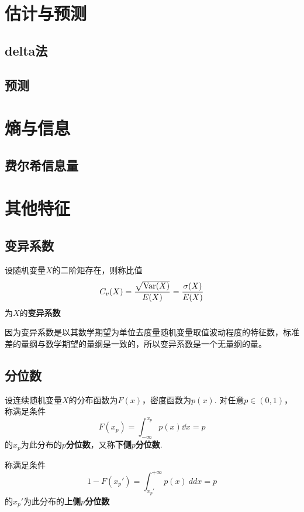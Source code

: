 \section{估计与预测}

\subsection{delta法}

\subsection{预测}

\section{熵与信息}

\subsection{费尔希信息量}

\section{其他特征}

\subsection{变异系数}

\begin{definition}[变异系数]
    设随机变量$X$的二阶矩存在，则称比值
    \[ C_v(X) = \frac{\sqrt{\operatorname{Var}(X)}}{E(X)} = \frac{\sigma(X)}{E(X)} \]
    为$X$的\textbf{变异系数}
\end{definition}

因为变异系数是以其数学期望为单位去度量随机变量取值波动程度的特征数，标准差的量纲与数学期望的量纲是一致的，所以变异系数是一个无量纲的量。

\subsection{分位数}

\begin{definition}[分位数]
    设连续随机变量$X$的分布函数为$F(x)$，密度函数为$p(x)$. 对任意$p\in(0,1)$，称满足条件
    \[ F(x_p) = \int_{-\infty}^{x_p}p(x)\dd x = p \]
    的$x_p$为此分布的\textbf{$p$分位数}，又称\textbf{下侧$p$分位数}.

    称满足条件
    \[ 1 - F(x_p') = \int_{x_p'}^{+\infty} p(x)\ dd x = p \]
    的$x_p'$为此分布的\textbf{上侧$p$分位数}
\end{definition}

